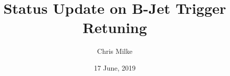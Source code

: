 \documentclass{beamer}
\begin{document}
\title{Status Update on B-Jet Trigger Retuning}   
\author{Chris Milke} 
\date{17 June, 2019} 

\frame{\titlepage} 






\end{document}
